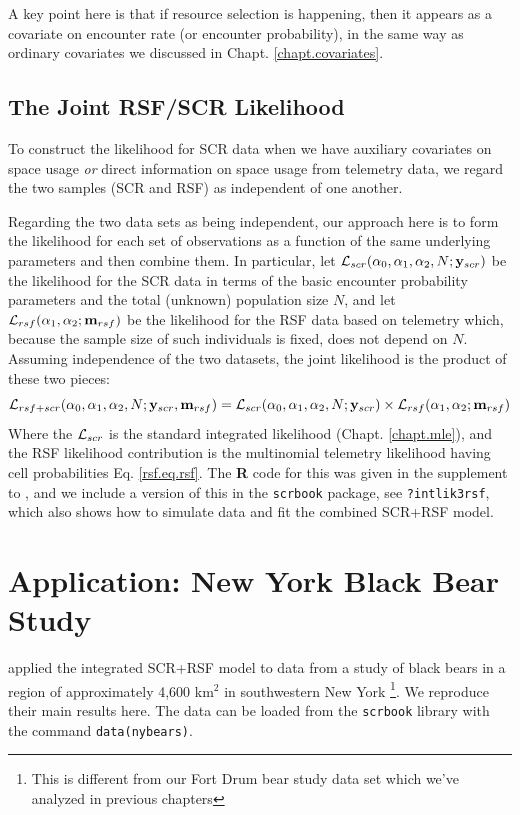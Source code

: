 A key point here is that if resource selection is happening, then it
appears as a covariate on encounter rate (or encounter
probability), in the same way as ordinary covariates we discussed in
Chapt. \ref{chapt.covariates}. 


\subsection{The Joint RSF/SCR Likelihood}

To construct the likelihood for SCR data when we have auxiliary
covariates on space usage {\it or} direct information on space usage
from telemetry data, we regard the two samples (SCR and RSF) as
independent of one another. 

Regarding the two data sets as being independent, our approach here
is to form the likelihood for each set of observations as a function
of the same underlying parameters and then combine them. In
particular, let ${\cal L}_{scr}(\alpha_{0}, \alpha_{1}, \alpha_{2}, N;{\bf y}_{scr})$
be the likelihood for the SCR data in terms of the basic encounter
probability parameters and the total (unknown) population size $N$,
and let ${\cal L}_{rsf}(\alpha_{1},\alpha_{2}; {\bf m}_{rsf})$ be the
likelihood for the RSF data based on telemetry which, because the
sample size of such individuals is fixed, does not depend on $N$.
Assuming independence of the two datasets, the
joint likelihood is the product of these two pieces:
\[
{\cal L}_{rsf+scr}(\alpha_{0},\alpha_{1},\alpha_{2},N; {\bf y}_{scr},{\bf
  m}_{rsf})  =
{\cal L}_{scr}(\alpha_{0}, \alpha_{1}, \alpha_{2}, N;{\bf y}_{scr})
\times 
{\cal L}_{rsf}(\alpha_{1},\alpha_{2}; {\bf m}_{rsf})
\]
Where the ${\cal L}_{scr}$ is the standard integrated likelihood
(Chapt. \ref{chapt.mle}), and the RSF likelihood contribution is the
multinomial telemetry likelihood having cell probabilities
Eq. \ref{rsf.eq.rsf}.  The {\bf R} code for this was given in the
supplement to \citet{royle_etal:2012mee}, and we include a version of
this in the \mbox{\tt scrbook} package, see \mbox{\tt ?intlik3rsf},
which also shows how to simulate data and fit the combined SCR+RSF
model. 



\section{Application: New York Black Bear Study}
\label{rsf.chapt.nybears}

\citet{royle_etal:2012mee} applied the integrated SCR+RSF model to
data from a study of black bears in a region of approximately 4,600
km$^2$ in southwestern New York \citep{sun:2013}\footnote{This is
different from our Fort Drum bear study data set which we've analyzed
in previous chapters}. We reproduce their
main results here.  The data can be loaded from the \mbox{\tt scrbook}
library with the command \mbox{\tt data(nybears)}. 


